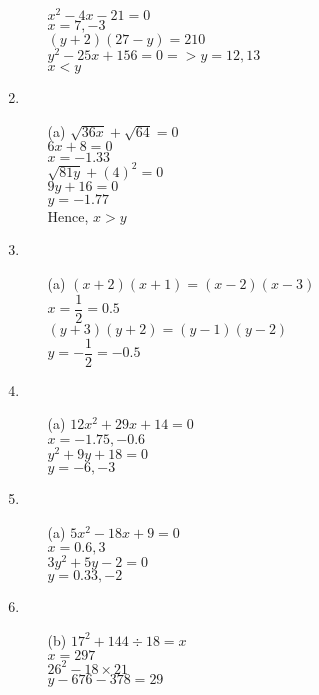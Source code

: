 \begin{multicols}{2}
\begin{enumerate}
\begin{itemize}
  $x^2 - 4x - 21 = 0$\\
  $x = 7, -3$\\
  $(y + 2)(27 - y) = 210$\\
  $y^2 - 25x + 156 = 0 = > y = 12, 13$\\
  $x < y$
\end{itemize}
\item
\begin{itemize}
\item[(a)] $\sqrt{36x} + \sqrt{64} = 0$\\
  $6x + 8 = 0$\\
  $x = -1.33$\\
  $\sqrt{81y} + (4)^{2} = 0$\\
  $9y + 16 = 0$\\
  $y = -1.77$\\
  Hence, $x > y$
\end{itemize}
\item
\begin{itemize}
\item[(a)] $(x + 2)(x + 1) = (x - 2)(x - 3)$\\
  $x = \dfrac{1}{2} = 0.5$\\[0.2cm]
  $(y + 3)(y + 2) = (y - 1)(y - 2)$\\[0.2cm]
  $y = -\dfrac{1}{2} = -0.5$
\end{itemize}
\item
\begin{itemize}
\item[(a)] $12x^2 + 29x + 14 = 0$\\
  $x = -1.75, -0.6$\\
  $y^2 + 9y + 18 = 0$\\
  $y = -6, -3$
\end{itemize}
\item
  \begin{itemize}
  \item[(a)] $5x^2 - 18x + 9 = 0$\\
    $x = 0.6, 3$\\
    $3y^2 + 5y - 2 = 0$\\
    $y = 0.33, -2$
  \end{itemize}
\item
\begin{itemize}
\item[(b)] $17^2 + 144 \div 18 = x$\\
  $x = 297$\\
  $26^2 - 18 \times 21$\\
  $y - 676 - 378 = 29$
\end{itemize}

\end{enumerate}
\end{multicols}
